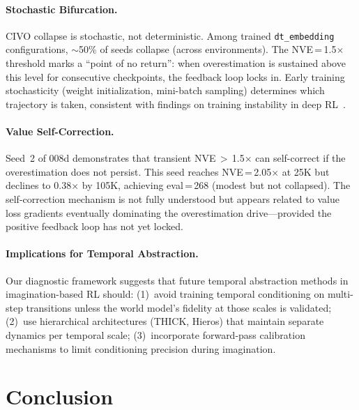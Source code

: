 \documentclass{article}
\begin{document}
\paragraph{Stochastic Bifurcation.}
CIVO collapse is stochastic, not deterministic.
Among trained \texttt{dt\_embedding} configurations, $\sim$50\% of seeds collapse (across environments).
The NVE\,=\,1.5$\times$ threshold marks a ``point of no return'': when overestimation is sustained above this level for consecutive checkpoints, the feedback loop locks in.
Early training stochasticity (weight initialization, mini-batch sampling) determines which trajectory is taken, consistent with findings on training instability in deep RL~\cite{henderson2018deep}.

\paragraph{Value Self-Correction.}
Seed~2 of 008d demonstrates that transient NVE\,$>$\,1.5$\times$ can self-correct if the overestimation does not persist.
This seed reaches NVE\,=\,2.05$\times$ at 25K but declines to 0.38$\times$ by 105K, achieving eval\,=\,268 (modest but not collapsed).
The self-correction mechanism is not fully understood but appears related to value loss gradients eventually dominating the overestimation drive---provided the positive feedback loop has not yet locked.

\paragraph{Implications for Temporal Abstraction.}
Our diagnostic framework suggests that future temporal abstraction methods in imagination-based RL should:
(1)~avoid training temporal conditioning on multi-step transitions unless the world model's fidelity at those scales is validated;
(2)~use hierarchical architectures (THICK, Hieros) that maintain separate dynamics per temporal scale;
(3)~incorporate forward-pass calibration mechanisms to limit conditioning precision during imagination.

\section{Conclusion}
\end{document}
